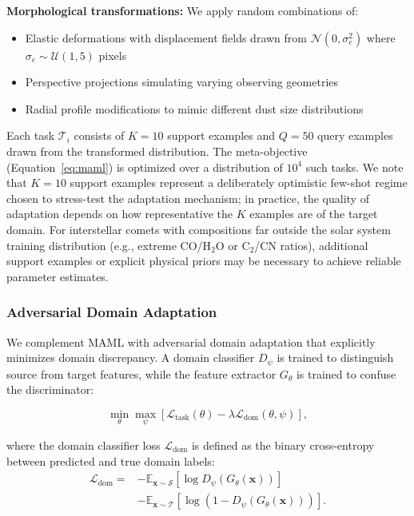 \documentclass[preprint2]{aastex631}
\begin{document}
\textbf{Morphological transformations:} We apply random combinations of:
\begin{itemize}
    \item Elastic deformations with displacement fields drawn from $\mathcal{N}(0, \sigma_e^2)$ where $\sigma_e \sim \mathcal{U}(1, 5)$ pixels
    \item Perspective projections simulating varying observing geometries
    \item Radial profile modifications to mimic different dust size distributions
\end{itemize}

Each task $\mathcal{T}_i$ consists of $K=10$ support examples and $Q=50$ query examples drawn from the transformed distribution. The meta-objective (Equation~\ref{eq:maml}) is optimized over a distribution of $10^4$ such tasks. We note that $K=10$ support examples represent a deliberately optimistic few-shot regime chosen to stress-test the adaptation mechanism; in practice, the quality of adaptation depends on how representative the $K$ examples are of the target domain. For interstellar comets with compositions far outside the solar system training distribution (e.g., extreme CO/H$_2$O or C$_2$/CN ratios), additional support examples or explicit physical priors may be necessary to achieve reliable parameter estimates.

\subsubsection{Adversarial Domain Adaptation}

We complement MAML with adversarial domain adaptation \citep{ganin16} that explicitly minimizes domain discrepancy. A domain classifier $D_\psi$ is trained to distinguish source from target features, while the feature extractor $G_\theta$ is trained to confuse the discriminator:

\begin{equation}\label{eq:adv_loss}
\min_\theta \max_\psi \left[ \mathcal{L}_{\text{task}}(\theta) - \lambda \mathcal{L}_{\text{dom}}(\theta, \psi) \right],
\end{equation}

where the domain classifier loss $\mathcal{L}_{\text{dom}}$ is defined as the binary cross-entropy between predicted and true domain labels:
\begin{equation}\label{eq:dom_loss}
\begin{split}
\mathcal{L}_{\text{dom}} ={} &
    -\mathbb{E}_{\mathbf{x} \sim \mathcal{S}}[\log D_\psi(G_\theta(\mathbf{x}))] \\
    &-\mathbb{E}_{\mathbf{x} \sim \mathcal{T}}[\log(1 - D_\psi(G_\theta(\mathbf{x})))].
\end{split}
\end{equation}
\end{document}
